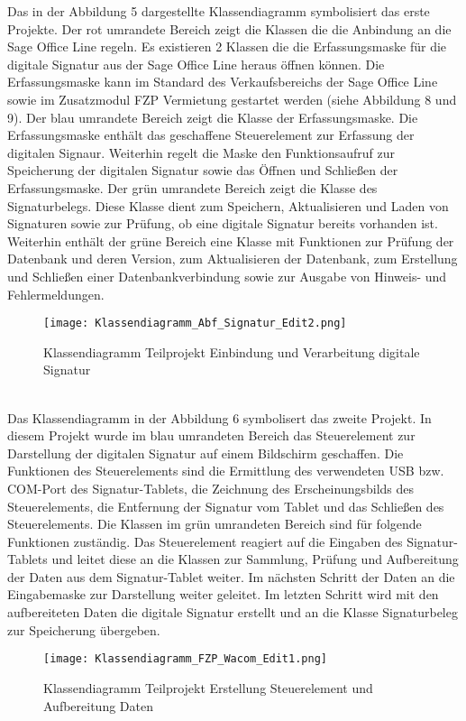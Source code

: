 Das in der Abbildung 5 dargestellte Klassendiagramm symbolisiert das erste Projekte. Der rot umrandete Bereich zeigt die Klassen die die Anbindung an die Sage Office Line regeln. Es existieren 2 Klassen die die Erfassungsmaske für die digitale Signatur aus der Sage Office Line heraus öffnen können. Die Erfassungsmaske kann im Standard des Verkaufsbereichs der Sage Office Line sowie im Zusatzmodul FZP Vermietung gestartet werden (siehe Abbildung 8 und 9). Der blau umrandete Bereich zeigt die Klasse der Erfassungsmaske. Die Erfassungsmaske enthält das geschaffene Steuerelement zur Erfassung der digitalen Signaur. Weiterhin regelt die Maske den Funktionsaufruf zur Speicherung der digitalen Signatur sowie das Öffnen und Schließen der Erfassungsmaske. Der grün umrandete Bereich zeigt die Klasse des Signaturbelegs. Diese Klasse dient zum Speichern, Aktualisieren und Laden von Signaturen sowie zur Prüfung, ob eine digitale Signatur bereits vorhanden ist. Weiterhin enthält der grüne Bereich eine Klasse mit Funktionen zur Prüfung der Datenbank und deren Version, zum Aktualisieren der Datenbank, zum Erstellung und Schließen einer Datenbankverbindung sowie zur Ausgabe von Hinweis- und Fehlermeldungen.
\begin{figure}[!ht]
    \centering
    \texttt{[image: Klassendiagramm\_Abf\_Signatur\_Edit2.png]}
    \caption[Klassendiagramm Einbindung und Verarbeitung digitale Signatur]{\small{Klassendiagramm Teilprojekt Einbindung und Verarbeitung digitale Signatur}}
\end{figure}\\
Das Klassendiagramm in der Abbildung 6 symbolisert das zweite Projekt. In diesem Projekt wurde im blau umrandeten Bereich das Steuerelement zur Darstellung der digitalen Signatur auf einem Bildschirm geschaffen. Die Funktionen des Steuerelements sind die Ermittlung des verwendeten USB bzw. COM-Port des Signatur-Tablets, die Zeichnung des Erscheinungsbilds des Steuerelements, die Entfernung der Signatur vom Tablet und das Schließen des Steuerelements. Die Klassen im grün umrandeten Bereich sind für folgende Funktionen zuständig. Das Steuerelement reagiert auf die Eingaben des Signatur-Tablets und leitet diese an die Klassen zur Sammlung, Prüfung und Aufbereitung der Daten aus dem Signatur-Tablet weiter. Im nächsten Schritt der Daten an die Eingabemaske zur Darstellung weiter geleitet. Im letzten Schritt wird mit den aufbereiteten Daten die digitale Signatur erstellt und an die Klasse Signaturbeleg zur Speicherung übergeben.
\begin{figure}[!ht]
    \centering
    \texttt{[image: Klassendiagramm\_FZP\_Wacom\_Edit1.png]}
    \caption[Klassendiagramm Erstellung Steuerelement und Aufbereitung Daten]{\small{Klassendiagramm Teilprojekt Erstellung Steuerelement und Aufbereitung Daten}}
\end{figure}\\

